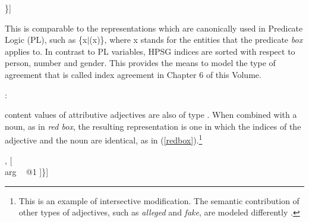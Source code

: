 \documentclass[output=paper]{langsci/langscibook}
\begin{document}
\begin{exe} 
\ex\label{red} 
\begin{avm}
[\type{scope-obj}        \\
 index ~ @1 \type{index} \\
 restr ~ \{[\type{box}   \\
            arg ~ @1 ]\}]
\end{avm} 
\end{exe}

\noindent
This is comparable to the representations which are canonically used in 
Predicate Logic (PL), such as \{x$|$(x)\}, where x stands for 
the entities that the predicate \emph{box} applies to. In contrast to 
PL variables, HPSG indices are sorted with respect to person, number 
and gender. This provides the means to model the type of agreement that 
is called index agreement in 
Chapter 6 of this Volume.

\begin{exe} 
\ex  {}: \begin{avm}
                     \end{avm} 
\end{exe} 

{\sc content} values of attributive adjectives are also of type . 
When combined with a noun, as in \emph{red box}, the resulting representation 
is one in which the indices of the adjective and the noun are identical, as in 
(\ref{redbox}).\footnote{This is an example of intersective modification. 
The semantic contribution of other types of adjectives, such as  
\emph{alleged} and \emph{fake}, are modeled differently \citep[330--331]{ps2}.}   

\begin{exe} 
\ex\label{redbox} 
\begin{avm}
[\type{scope-obj}         \\
 index ~ @1                \\
 restr ~ \{ [\type{red}   \\
             arg ~ @1 ] ,
            [   \\
             arg ~ @1 ]\}]
\end{avm}
\end{exe}
\end{document}
